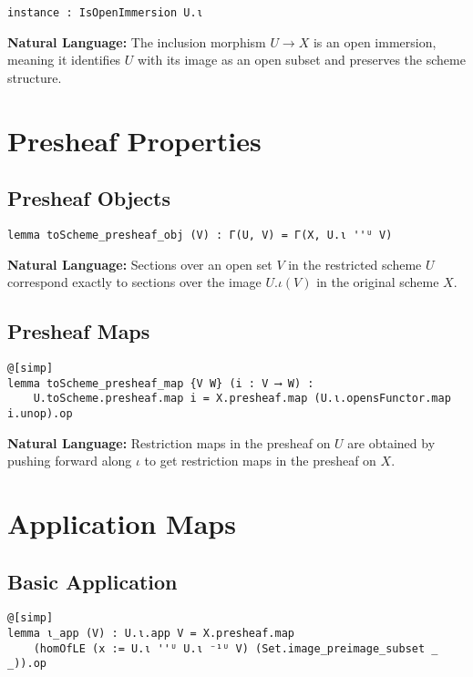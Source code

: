 \documentclass{article}
\theoremstyle{definition}
\begin{document}
\begin{lstlisting}
instance : IsOpenImmersion U.ι
\end{lstlisting}

\textbf{Natural Language:} The inclusion morphism $U \to X$ is an open immersion, meaning it identifies $U$ with its image as an open subset and preserves the scheme structure.

\section{Presheaf Properties}

\subsection{Presheaf Objects}

\begin{lstlisting}
lemma toScheme_presheaf_obj (V) : Γ(U, V) = Γ(X, U.ι ''ᵁ V)
\end{lstlisting}

\textbf{Natural Language:} Sections over an open set $V$ in the restricted scheme $U$ correspond exactly to sections over the image $U.ι(V)$ in the original scheme $X$.

\subsection{Presheaf Maps}

\begin{lstlisting}
@[simp]
lemma toScheme_presheaf_map {V W} (i : V ⟶ W) :
    U.toScheme.presheaf.map i = X.presheaf.map (U.ι.opensFunctor.map i.unop).op
\end{lstlisting}

\textbf{Natural Language:} Restriction maps in the presheaf on $U$ are obtained by pushing forward along $\iota$ to get restriction maps in the presheaf on $X$.

\section{Application Maps}

\subsection{Basic Application}

\begin{lstlisting}
@[simp]
lemma ι_app (V) : U.ι.app V = X.presheaf.map
    (homOfLE (x := U.ι ''ᵁ U.ι ⁻¹ᵁ V) (Set.image_preimage_subset _ _)).op
\end{lstlisting}
\end{document}
